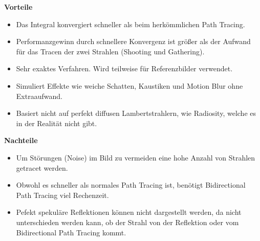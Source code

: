 \documentclass[a4paper,headings=small]{scrartcl}
\numberwithin{equation}{section} %
\numberwithin{figure}{section}   %
\begin{document}
\textbf{Vorteile}
\begin{itemize}
\item Das Integral konvergiert schneller als beim herkömmlichen Path Tracing.
\item Performanzgewinn durch schnellere Konvergenz ist größer als der Aufwand für das Tracen der zwei Strahlen (Shooting und Gathering).
\item Sehr exaktes Verfahren. Wird teilweise für Referenzbilder verwendet.
\item Simuliert Effekte wie weiche Schatten, Kaustiken und Motion Blur ohne Extraaufwand.
\item Basiert nicht auf perfekt diffusen Lambertstrahlern, wie Radiosity, welche es in der Realität nicht gibt.
\end{itemize}

\textbf{Nachteile}
\begin{itemize}
\item Um Störungen (Noise) im Bild zu vermeiden eine hohe Anzahl von Strahlen getracet werden.
\item Obwohl es schneller als normales Path Tracing ist, benötigt Bidirectional Path Tracing viel Rechenzeit.
\item Pefekt spekuläre Reflektionen können nicht dargestellt werden, da nicht unterschieden werden kann, ob der Strahl von der Reflektion oder vom Bidirectional Path Tracing kommt.
\end{itemize}
\end{document}
